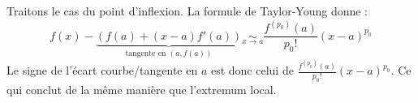 \documentclass{article}
\begin{document}
\begin{question_kholle}
	Traitons le cas du point d'inflexion. La formule de Taylor-Young donne :
	\begin{equation}
		f(x) - \underbrace{\left( f(a) + (x-a)f'(a) \right)}_{\text{tangente en } (a,f(a))}
		\underset{x \rightarrow a}{\sim} \frac{f^{(p_0)}(a)}{p_0!} (x-a)^{p_0}
	\end{equation}
	Le signe de l'écart courbe/tangente en $a$ est donc celui de $\frac{f^{(p_0)}(a)}{p_0!} (x-a)^{p_0}$. Ce qui conclut de la même manière que l'extremum local.
\end{question_kholle}
\end{document}
